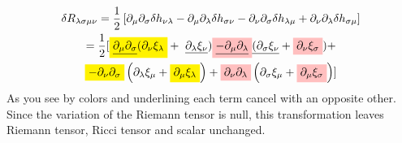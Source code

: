\begin{gather*}
	\delta R_{\lambda \sigma \mu \nu } = \frac{1}{2}\left[ \partial_{\mu }\partial_{\sigma }\delta h_{\nu \lambda } - \partial_{\mu }\partial_{\lambda }\delta h_{\sigma \nu } - \partial_{\nu }\partial_{\sigma }\delta h_{\lambda \mu } + \partial_{\nu }\partial_{\lambda }\delta h_{\sigma \mu } \right]\\
	= \frac{1}{2}[ \colorbox{yellow}{\underline{$ \partial_{\mu }\partial_{\sigma }$}$( \partial_{\nu }\xi _{\lambda }$}+ \text{ \underline{$\partial_{\lambda }\xi _{\nu }$}} ) \colorbox{pink}{\underline{$-  \partial_{\mu }\partial_{\lambda }$}}\text{\underline{$( \partial_{\sigma }\xi _{\nu }$}}+ \colorbox{pink}{$ \partial_{\nu }\xi _{\sigma }$}) + \\
	\colorbox{yellow}{$ - \partial_{\nu }\partial_{\sigma }$}\left( \partial_{\lambda }\xi _{\mu }+ \colorbox{yellow}{$ \partial_{\mu }\xi _{\lambda } $}\right) + \colorbox{pink}{$ \partial_{\nu }\partial_{\lambda }$}\left( \partial_{\sigma }\xi _{\mu }+ \colorbox{pink}{$ \partial_{\mu }\xi _{\sigma }$} \right) ] 
\end{gather*}
As you see by colors and underlining each term cancel with an opposite other. Since the variation of the Riemann tensor is null, this transformation leaves Riemann tensor, Ricci tensor and scalar unchanged.

























